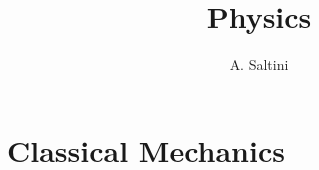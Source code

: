 \documentclass[12pt,parskip=full]{scrbook}
\title{Physics}
\author{A. Saltini}
\date{}
\begin{document}
\maketitle

\part{Classical Mechanics}


\end{document}
